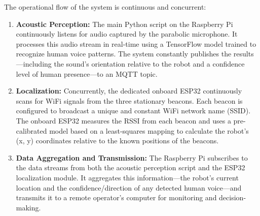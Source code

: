 The operational flow of the system is continuous and concurrent:
\begin{enumerate}
    \item \textbf{Acoustic Perception:} The main Python script on the Raspberry Pi continuously listens for audio captured by the parabolic microphone. It processes this audio stream in real-time using a TensorFlow model trained to recognize human voice patterns. The system constantly publishes the results—including the sound's orientation relative to the robot and a confidence level of human presence—to an MQTT topic.
    \item \textbf{Localization:} Concurrently, the dedicated onboard ESP32 continuously scans for WiFi signals from the three stationary beacons. Each beacon is configured to broadcast a unique and constant WiFi network name (SSID). The onboard ESP32 measures the RSSI from each beacon and uses a pre-calibrated model based on a least-squares mapping to calculate the robot's (x, y) coordinates relative to the known positions of the beacons.
    \item \textbf{Data Aggregation and Transmission:} The Raspberry Pi subscribes to the data streams from both the acoustic perception script and the ESP32 localization module. It aggregates this information—the robot's current location and the confidence/direction of any detected human voice—and transmits it to a remote operator's computer for monitoring and decision-making.
\end{enumerate}
